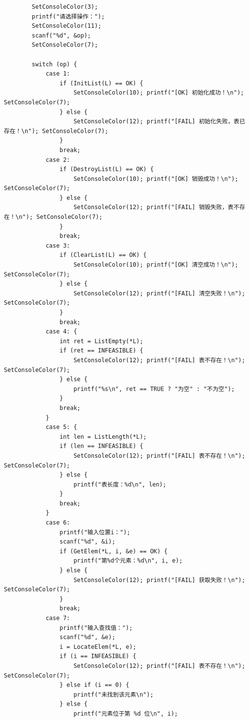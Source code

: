 \documentclass[supercite]{Experimental_Report}
\begin{document}
{\begin{lstlisting}
        SetConsoleColor(3);
        printf("请选择操作：");
        SetConsoleColor(11);
        scanf("%d", &op);
        SetConsoleColor(7);

        switch (op) {
            case 1:
                if (InitList(L) == OK) {
                    SetConsoleColor(10); printf("[OK] 初始化成功！\n"); SetConsoleColor(7);
                } else {
                    SetConsoleColor(12); printf("[FAIL] 初始化失败，表已存在！\n"); SetConsoleColor(7);
                }
                break;
            case 2:
                if (DestroyList(L) == OK) {
                    SetConsoleColor(10); printf("[OK] 销毁成功！\n"); SetConsoleColor(7);
                } else {
                    SetConsoleColor(12); printf("[FAIL] 销毁失败，表不存在！\n"); SetConsoleColor(7);
                }
                break;
            case 3:
                if (ClearList(L) == OK) {
                    SetConsoleColor(10); printf("[OK] 清空成功！\n"); SetConsoleColor(7);
                } else {
                    SetConsoleColor(12); printf("[FAIL] 清空失败！\n"); SetConsoleColor(7);
                }
                break;
            case 4: {
                int ret = ListEmpty(*L);
                if (ret == INFEASIBLE) {
                    SetConsoleColor(12); printf("[FAIL] 表不存在！\n"); SetConsoleColor(7);
                } else {
                    printf("%s\n", ret == TRUE ? "为空" : "不为空");
                }
                break;
            }
            case 5: {
                int len = ListLength(*L);
                if (len == INFEASIBLE) {
                    SetConsoleColor(12); printf("[FAIL] 表不存在！\n"); SetConsoleColor(7);
                } else {
                    printf("表长度：%d\n", len);
                }
                break;
            }
            case 6:
                printf("输入位置i：");
                scanf("%d", &i);
                if (GetElem(*L, i, &e) == OK) {
                    printf("第%d个元素：%d\n", i, e);
                } else {
                    SetConsoleColor(12); printf("[FAIL] 获取失败！\n"); SetConsoleColor(7);
                }
                break;
            case 7:
                printf("输入查找值：");
                scanf("%d", &e);
                i = LocateElem(*L, e);
                if (i == INFEASIBLE) {
                    SetConsoleColor(12); printf("[FAIL] 表不存在！\n"); SetConsoleColor(7);
                } else if (i == 0) {
                    printf("未找到该元素\n");
                } else {
                    printf("元素位于第 %d 位\n", i);

\end{lstlisting}}
\end{document}

